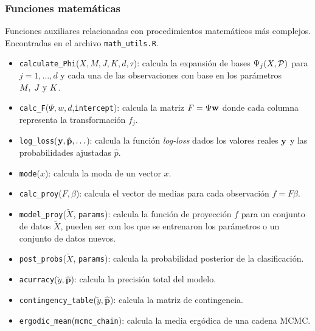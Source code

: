 \documentclass[../../Main/Main.tex]{subfiles}
\begin{document}
\subsubsection*{Funciones matemáticas}
Funciones auxiliares relacionadas con procedimientos matemáticos más complejos. Encontradas en el archivo \verb|math_utils.R|.
\begin{itemize}[label = {}]
	\item \verb|calculate_Phi|($X,M,J,K,d,\tau$): calcula la expansión de bases $\Psi_j(X,\P)$ para $j = 1,\ldots,d$ y cada una de las observaciones con base en los parámetros $\MJK$.
	\item \verb|calc_F|($\Psi,w,d$,\verb|intercept|): calcula la matriz $F = \Psi \wsn$ donde cada columna representa la transformación $f_j$.
	\item \verb|log_loss|($\ysn,\hat{\mathbf{p}},\ldots $): calcula la función \textit{log-loss} dados los valores reales $\ysn$ y las probabilidades ajustadas $\hat{p}$.
	\item \verb|mode|($x$): calcula la moda de un vector $x$.
	\item \verb|calc_proy|($F,\beta$): calcula el vector de medias para cada observación $f=F\beta$.
	\item \verb|model_proy|($\tilde{X}$, \verb|params|): calcula la función de proyección $f$ para un conjunto de datos $\tilde{X}$, pueden ser con los que se entrenaron los parámetros o un conjunto de datos nuevos.
	\item \verb|post_probs|($\tilde{X}$, \verb|params|): calcula la probabilidad posterior de la clasificación. 
	\item \verb|acurracy|($\tilde{y},\hat{\mathbf{p}}$): calcula la precisión total del modelo.
	\item \verb|contingency_table|($\tilde{y},\hat{\mathbf{p}}$): calcula la matriz de contingencia.
	\item \verb|ergodic_mean|(\verb|mcmc_chain|): calcula la media ergódica de una cadena MCMC.
\end{itemize}
\end{document}
